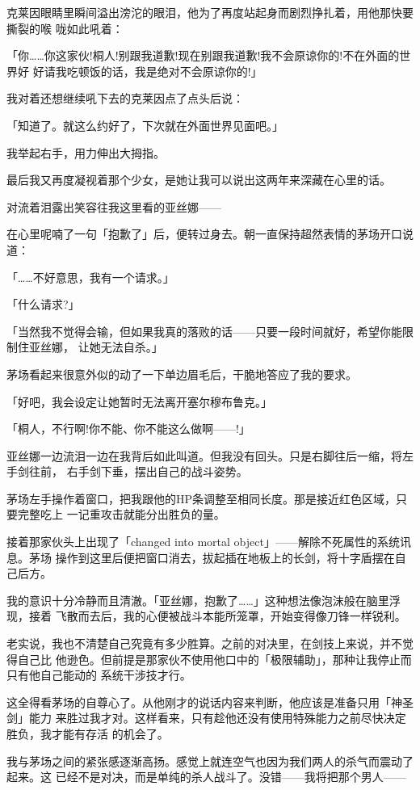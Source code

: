 \documentclass[11pt]{book}
\begin{document}
克莱因眼睛里瞬间溢出滂沱的眼泪，他为了再度站起身而剧烈挣扎着，用他那快要撕裂的喉
咙如此吼着：

「你……你这家伙!桐人!别跟我道歉!现在别跟我道歉!我不会原谅你的!不在外面的世界好
好请我吃顿饭的话，我是绝对不会原谅你的!」

我对着还想继续吼下去的克莱因点了点头后说：

「知道了。就这么约好了，下次就在外面世界见面吧。」

我举起右手，用力伸出大拇指。

最后我又再度凝视着那个少女，是她让我可以说出这两年来深藏在心里的话。

对流着泪露出笑容往我这里看的亚丝娜——

在心里呢喃了一句「抱歉了」后，便转过身去。朝一直保持超然表情的茅场开口说道：

「……不好意思，我有一个请求。」

「什么请求?」

「当然我不觉得会输，但如果我真的落败的话——只要一段时间就好，希望你能限制住亚丝娜，
让她无法自杀。」

茅场看起来很意外似的动了一下单边眉毛后，干脆地答应了我的要求。

「好吧，我会设定让她暂时无法离开塞尔穆布鲁克。」

「桐人，不行啊!你不能、你不能这么做啊——!」

亚丝娜一边流泪一边在我背后如此叫道。但我没有回头。只是右脚往后一缩，将左手剑往前，
右手剑下垂，摆出自己的战斗姿势。

茅场左手操作着窗口，把我跟他的HP条调整至相同长度。那是接近红色区域，只要完整吃上
一记重攻击就能分出胜负的量。

接着那家伙头上出现了「changed into mortal object」——解除不死属性的系统讯息。茅场
操作到这里后便把窗口消去，拔起插在地板上的长剑，将十字盾摆在自己后方。

我的意识十分冷静而且清澈。「亚丝娜，抱歉了……」这种想法像泡沫般在脑里浮现，接着
飞散而去后，我的心便被战斗本能所笼罩，开始变得像刀锋一样锐利。

老实说，我也不清楚自己究竟有多少胜算。之前的对决里，在剑技上来说，并不觉得自己比
他逊色。但前提是那家伙不使用他口中的「极限辅助」，那种让我停止而只有他自己能动的
系统干涉技才行。

这全得看茅场的自尊心了。从他刚才的说话内容来判断，他应该是准备只用「神圣剑」能力
来胜过我才对。这样看来，只有趁他还没有使用特殊能力之前尽快决定胜负，我才能有存活
的机会了。

我与茅场之间的紧张感逐渐高扬。感觉上就连空气也因为我们两人的杀气而震动了起来。这
已经不是对决，而是单纯的杀人战斗了。没错——我将把那个男人——
\end{document}
